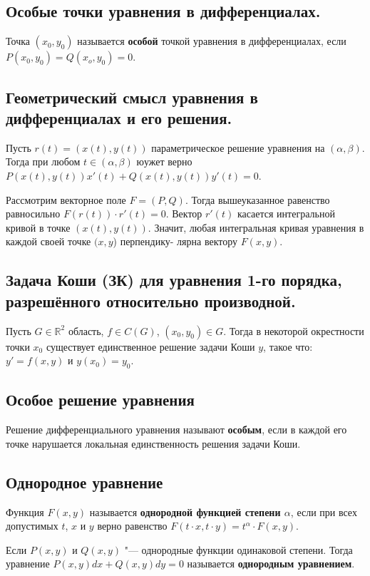 \documentclass{article}
\begin{document}
\subsection{Особые точки уравнения в дифференциалах.}
Точка $(x_0, y_0)$ называется \textbf{особой} точкой уравнения в дифференциалах, если $P(x_0, y_0) = Q(x_o, y_0) = 0$.

\subsection{Геометрический смысл уравнения в дифференциалах и его решения.}
Пусть $r(t) = (x(t), y(t))$ параметрическое решение уравнения на $(\alpha, \beta)$. Тогда при любом $t \in (\alpha, \beta)$ юужет верно
$P(x(t), y(t))x'(t) + Q(x(t), y(t))y'(t) = 0$. 

Рассмотрим векторное поле $F = (P, Q)$. Тогда вышеуказанное равенство равносильно $F(r(t)) \cdot r'(t) = 0$. Вектор $r'(t)$ касается интегральной кривой в точке $(x(t), y(t))$. Значит, любая интегральная кривая уравнения в каждой своей точке $(x, y$) перпендику-
лярна вектору $F(x, y)$.

\subsection{Задача Коши (ЗК) для уравнения 1-го порядка, разрешённого относительно производной.}
Пусть $G \in \mathbb{R}^2$ область, $f \in C(G)$, $(x_0, y_0) \in G$. Тогда в некоторой окрестности точки $x_0$ существует единственное решение задачи Коши $y$, такое что: $y' = f(x, y)$ и $y(x_0) = y_0$.

\subsection{Особое решение уравнения}
Решение дифференциального уравнения называют \textbf{особым}, если в каждой его точке нарушается локальная единственность решения задачи Коши.

\subsection{Однородное уравнение}
Функция $F(x, y)$ называется \textbf{однородной функцией степени $\alpha$}, если при всех допустимых $t$, $x$ и $y$ верно равенство $F(t\cdot x, t\cdot y) = t^{\alpha} \cdot F(x, y)$.

Если $P(x, y)$ и $Q(x, y)$ "--- однородные функции одинаковой степени. Тогда уравнение $P(x, y)dx + Q(x, y)dy = 0$ называется \textbf{однородным уравнением}.
\end{document}
